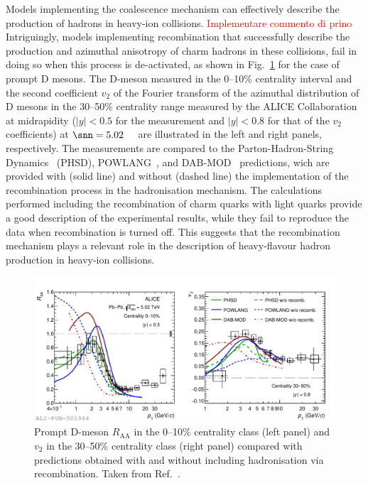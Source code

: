 Models implementing the coalescence mechanism can effectively describe the production of hadrons in heavy-ion collisions. \textcolor{red}{Implementare commento di prino} Intriguingly, models implementing recombination that successfully describe the production and azimuthal anisotropy of charm hadrons in these collisions, fail in doing so when this process is de-activated, as shown in Fig.~\ref{fig:D_recombination} for the case of prompt D mesons. The D-meson \raa measured in the 0--10\% centrality interval and the second coefficient $v_2$ of the Fourier transform of the azimuthal distribution of D mesons in the 30--50\% centrality range measured by the ALICE Collaboration at midrapidity ($\lvert y\lvert<0.5$ for the \raa measurement and $\lvert y\lvert<0.8$ for that of the $v_2$ coefficients) at $\snn=5.02$~\tev~\cite{ALICE:2021rxa} are illustrated in the left and right panels, respectively. The measurements are compared to the Parton-Hadron-String Dynamics~\cite{Cassing:2008sv} (PHSD), POWLANG~\cite{Beraudo:2014boa}, and DAB-MOD~\cite{Katz:2019fkc} predictions, wich are provided with (solid line) and without (dashed line) the implementation of the recombination process in the hadronisation mechanism. The calculations performed including the recombination of charm quarks with light quarks provide a good description of the experimental results, while they fail to reproduce the data when recombination is turned off. This suggests that the recombination mechanism plays a relevant role in the description of heavy-flavour hadron production in heavy-ion collisions.
\begin{figure}[htb]
  \centering
  \includegraphics[width=\linewidth]{Figures/Chapter 2/D_Raa010_V23050_FragCoal_3models_1.pdf}
  \caption{Prompt D-meson $R_\mathrm{AA}$ in the 0--10\% centrality class (left panel) and $v_2$ in the 30--50\% centrality class (right panel) compared with predictions obtained with and without including hadronisation via recombination. Taken from Ref.~\cite{ALICE:2021rxa}.}
  \label{fig:D_recombination}
\end{figure}

